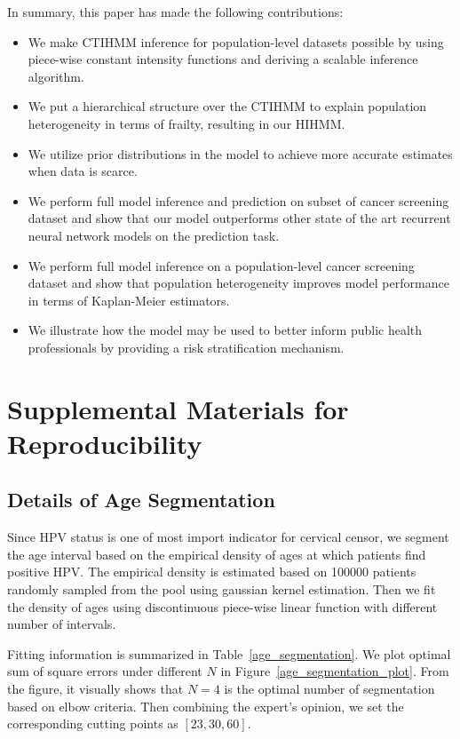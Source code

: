 \documentclass{article}
\begin{document}
In summary, this paper has made the following contributions:
\begin{itemize}
	\item We make CTIHMM inference for population-level datasets possible by using piece-wise constant intensity functions and deriving a scalable inference algorithm.
	\item We put a hierarchical structure over the CTIHMM to explain population heterogeneity in terms of frailty, resulting in our HIHMM.
	\item We utilize prior distributions in the model to achieve more accurate estimates when data is scarce.    
	\item We perform full model inference and prediction on subset of cancer screening dataset and show that our model outperforms other state of the art recurrent neural network models on the prediction task.
	\item We perform full model inference on a population-level cancer screening dataset and show that population heterogeneity improves model performance in terms of Kaplan-Meier estimators. 
	\item We illustrate how the model may be used to better inform public health professionals by providing a risk stratification mechanism. 
\end{itemize}


\newpage



\newpage
\section{Supplemental Materials for Reproducibility}
\subsection{Details of Age Segmentation}
Since HPV status is one of most import indicator for cervical censor, we segment the age interval based on the empirical density of ages at which patients find positive HPV. The empirical density is estimated based on 100000 patients randomly sampled from the pool using gaussian kernel estimation. Then we fit the density of ages using discontinuous piece-wise linear function with different number of intervals. 

Fitting information is summarized in Table~\ref{age_segmentation}. We plot optimal sum of square errors under different $N$ in Figure~\ref{age_segmentation_plot}. From the figure, it visually shows that $N=4$ is the optimal number of segmentation based on elbow criteria. Then combining the expert's opinion, we set the corresponding cutting points as $[23,30,60]$. 
\end{document}

